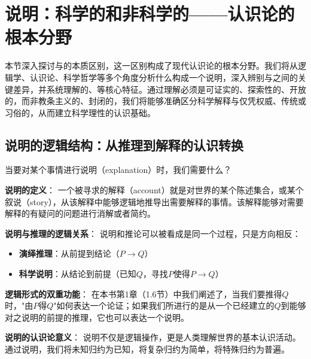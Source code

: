 \section{说明：科学的和非科学的——认识论的根本分野}

\begin{logicbox}[title=引言]
本节深入探讨与的本质区别，这一区别构成了现代认识论的根本分野。我们将从逻辑学、认识论、科学哲学等多个角度分析什么构成一个说明，深入辨别与之间的关键差异，并系统理解的、等核心特征。通过理解必须是可证实的、探索性的、开放的，而非教条主义的、封闭的，我们将能够准确区分科学解释与仅凭权威、传统或习俗的，从而建立科学理性的认识基础。
\end{logicbox}

\subsection{说明的逻辑结构：从推理到解释的认识转换}

\begin{theorembox}[title=说明的逻辑本质]
当要对某个事情进行说明（explanation）时，我们需要什么？

\textbf{说明的定义}：
一个被寻求的解释（account）就是对世界的某个陈述集合，或某个叙说（story），从该解释中能够逻辑地推导出需要解释的事情。该解释能够对需要解释的有疑问的问题进行消解或者简约。

\textbf{说明与推理的逻辑关系}：
说明和推论可以被看成是同一个过程，只是方向相反：
\begin{itemize}
\item \textbf{演绎推理}：从前提到结论（$P \rightarrow Q$）
\item \textbf{科学说明}：从结论到前提（已知$Q$，寻找$P$使得$P \rightarrow Q$）
\end{itemize}

\textbf{逻辑形式的双重功能}：
在本书第1章（1.6节）中我们阐述了，当我们要推得$Q$时，"由$P$得$Q$"如何表达一个论证；如果我们所进行的是从一个已经建立的$Q$到能够对之说明的前提的推理，它也可以表达一个说明。

\textbf{说明的认识论意义}：
说明不仅是逻辑操作，更是人类理解世界的基本认识活动。通过说明，我们将未知归约为已知，将复杂归约为简单，将特殊归约为普遍。
\end{theorembox}

